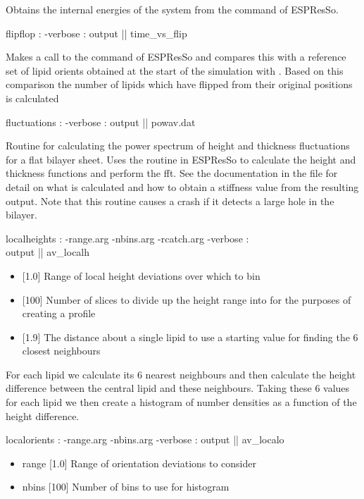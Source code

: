 Obtains the internal energies of the system from the  command of ESPResSo.
\begin{code}
  flipflop : -verbose : output || time_vs_flip
\end{code}
Makes a call to the  command of ESPResSo and compares this with a reference set of lipid orients obtained at the start of the simulation with . Based on this comparison the number of lipids which have flipped from their original positions is calculated
\begin{code}
  fluctuations : -verbose : output || powav.dat
\end{code}
Routine for calculating the power spectrum of height and thickness fluctuations for a flat bilayer sheet. Uses the  routine in ESPResSo to calculate the height and thickness functions and perform the fft. See the documentation in the file  for detail on what is calculated and how to obtain a stiffness value from the resulting output. Note that this routine causes a crash if it detects a large hole in the bilayer.
\begin{code}
  localheights : -range.arg -nbins.arg -rcatch.arg -verbose : \\
                 output || av_localh
\end{code}
\begin{itemize}
    \item {} [1.0] Range of local height deviations over which to bin
    \item {} [100] Number of slices to divide up the height range into for the purposes of creating a profile
    \item {} [1.9] The distance about a single lipid to use a starting value for finding the 6 closest neighbours
\end{itemize}
For each lipid we calculate its 6 nearest neighbours and then calculate the height difference between the central lipid and these neighbours. Taking these 6 values for each lipid we then create a histogram of number densities as a function of the height difference.
\begin{code}
  localorients : -range.arg -nbins.arg -verbose : output || av_localo
\end{code}
\begin{itemize}
    \item range [1.0] Range of orientation deviations to consider
    \item nbins [100] Number of bins to use for histogram
\end{itemize}
